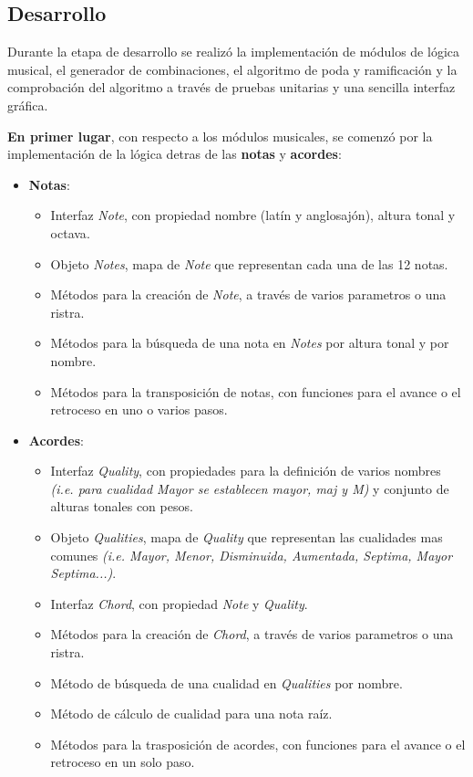 \subsection{Desarrollo}
Durante la etapa de desarrollo se realizó la implementación de módulos de lógica musical, el generador de combinaciones, el algoritmo de poda y ramificación y la comprobación del algoritmo a través de pruebas unitarias y una sencilla interfaz gráfica.

\textbf{En primer lugar}, con respecto a los módulos musicales, se comenzó por la implementación de la lógica detras de las \textbf{notas} y \textbf{acordes}:

\begin{itemize}
    \item \textbf{Notas}:
    \begin{itemize}
        \item Interfaz \textit{Note}, con propiedad nombre (latín y anglosajón), \gls{altura tonal} y \gls{octava}.
        \item Objeto \textit{Notes}, mapa de \textit{Note} que representan cada una de las 12 notas.
        \item Métodos para la creación de \textit{Note}, a través de varios parametros o una ristra.
        \item Métodos para la búsqueda de una nota en \textit{Notes} por altura tonal y por nombre.
        \item Métodos para la \gls{transposición} de notas, con funciones para el avance o el retroceso en uno o varios pasos.
    \end{itemize}

    \item \textbf{Acordes}:
    \begin{itemize}
        \item Interfaz \textit{Quality}, con propiedades para la definición de varios nombres \textit{(i.e. para cualidad Mayor se establecen mayor, maj y M)} y conjunto de alturas tonales con pesos.
        \item Objeto \textit{Qualities}, mapa de \textit{Quality} que representan las \gls{cualidad}es mas comunes \textit{(i.e. Mayor, Menor, Disminuida, Aumentada, Septima, Mayor Septima...)}.
        \item Interfaz \textit{Chord}, con propiedad \textit{Note} y \textit{Quality}.
        \item Métodos para la creación de \textit{Chord}, a través de varios parametros o una ristra.
        \item Método de búsqueda de una cualidad en \textit{Qualities} por nombre.
        \item Método de cálculo de cualidad para una nota raíz.
        \item Métodos para la trasposición de acordes, con funciones para el avance o el retroceso en un solo paso.
    \end{itemize}
\end{itemize}

